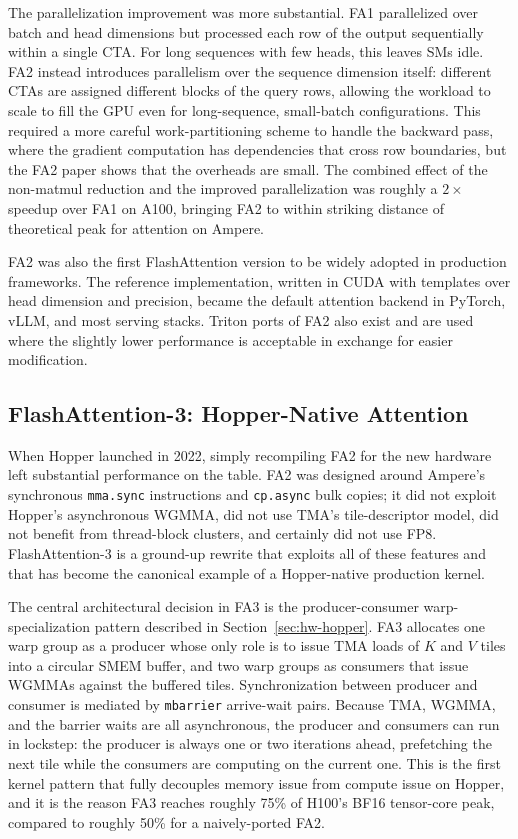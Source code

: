 \documentclass[10pt]{article}
\begin{document}
The parallelization improvement was more substantial. FA1 parallelized over batch and head dimensions but processed each row of the output sequentially within a single CTA. For long sequences with few heads, this leaves SMs idle. FA2 instead introduces parallelism over the sequence dimension itself: different CTAs are assigned different blocks of the query rows, allowing the workload to scale to fill the GPU even for long-sequence, small-batch configurations. This required a more careful work-partitioning scheme to handle the backward pass, where the gradient computation has dependencies that cross row boundaries, but the FA2 paper shows that the overheads are small. The combined effect of the non-matmul reduction and the improved parallelization was roughly a $2\times$ speedup over FA1 on A100, bringing FA2 to within striking distance of theoretical peak for attention on Ampere.

FA2 was also the first FlashAttention version to be widely adopted in production frameworks. The reference implementation, written in CUDA with templates over head dimension and precision, became the default attention backend in PyTorch, vLLM, and most serving stacks. Triton ports of FA2 also exist and are used where the slightly lower performance is acceptable in exchange for easier modification.

\subsection{FlashAttention-3: Hopper-Native Attention}
\label{sec:fa3}

When Hopper launched in 2022, simply recompiling FA2 for the new hardware left substantial performance on the table. FA2 was designed around Ampere's synchronous \texttt{mma.sync} instructions and \texttt{cp.async} bulk copies; it did not exploit Hopper's asynchronous WGMMA, did not use TMA's tile-descriptor model, did not benefit from thread-block clusters, and certainly did not use FP8. FlashAttention-3 \citep{shah2024flashattention3} is a ground-up rewrite that exploits all of these features and that has become the canonical example of a Hopper-native production kernel.

The central architectural decision in FA3 is the producer-consumer warp-specialization pattern described in Section~\ref{sec:hw-hopper}. FA3 allocates one warp group as a producer whose only role is to issue TMA loads of $K$ and $V$ tiles into a circular SMEM buffer, and two warp groups as consumers that issue WGMMAs against the buffered tiles. Synchronization between producer and consumer is mediated by \texttt{mbarrier} arrive-wait pairs. Because TMA, WGMMA, and the barrier waits are all asynchronous, the producer and consumers can run in lockstep: the producer is always one or two iterations ahead, prefetching the next tile while the consumers are computing on the current one. This is the first kernel pattern that fully decouples memory issue from compute issue on Hopper, and it is the reason FA3 reaches roughly 75\% of H100's BF16 tensor-core peak, compared to roughly 50\% for a naively-ported FA2.
\end{document}
